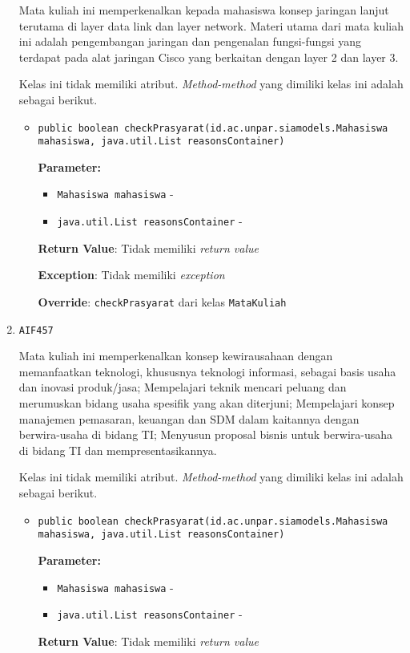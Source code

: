 \documentclass{article}
\begin{document}
\begin{enumerate}
Mata kuliah ini memperkenalkan kepada mahasiswa konsep jaringan lanjut
 terutama di layer data link dan layer network. Materi utama dari mata kuliah
 ini adalah pengembangan jaringan dan pengenalan fungsi-fungsi yang terdapat
 pada alat jaringan Cisco yang berkaitan dengan layer 2 dan layer 3.

Kelas ini tidak memiliki atribut. \textit{Method-method} yang dimiliki kelas ini adalah sebagai berikut.
\begin{itemize}
\item \texttt{public boolean checkPrasyarat(id.ac.unpar.siamodels.Mahasiswa mahasiswa, java.util.List reasonsContainer)}

\textbf{Parameter:}
\begin{itemize}
\item \texttt{Mahasiswa mahasiswa} - 
\item \texttt{java.util.List reasonsContainer} - 
\end{itemize}
\textbf{Return Value}: Tidak memiliki \textit{return value}

\textbf{Exception}: Tidak memiliki \textit{exception}

\textbf{Override}: \texttt{checkPrasyarat} dari kelas \texttt{MataKuliah}

\end{itemize}
\item \texttt{AIF457}

Mata kuliah ini memperkenalkan konsep kewirausahaan dengan memanfaatkan teknologi, khususnya
 teknologi informasi, sebagai basis usaha dan inovasi produk/jasa; Mempelajari
 teknik mencari peluang dan merumuskan bidang usaha spesifik yang akan
 diterjuni; Mempelajari konsep manajemen pemasaran, keuangan dan SDM dalam
 kaitannya dengan berwira-usaha di bidang TI; Menyusun proposal bisnis untuk
 berwira-usaha di bidang TI dan mempresentasikannya.

Kelas ini tidak memiliki atribut. \textit{Method-method} yang dimiliki kelas ini adalah sebagai berikut.
\begin{itemize}
\item \texttt{public boolean checkPrasyarat(id.ac.unpar.siamodels.Mahasiswa mahasiswa, java.util.List reasonsContainer)}

\textbf{Parameter:}
\begin{itemize}
\item \texttt{Mahasiswa mahasiswa} - 
\item \texttt{java.util.List reasonsContainer} - 
\end{itemize}
\textbf{Return Value}: Tidak memiliki \textit{return value}


\end{itemize}
\end{enumerate}
\end{document}
